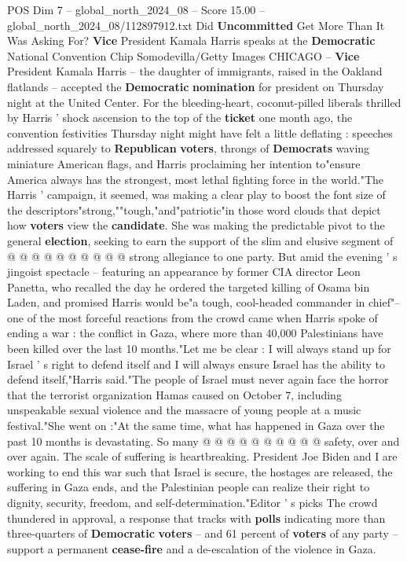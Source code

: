 \begin{textsample}{POS Dim 7 – global\_north\_2024\_08 – Score 15.00 – global\_north\_2024\_08/112897912.txt}  \label{ex:f7_pos_004}
Did \textbf{Uncommitted} Get More Than It Was Asking For? \textbf{Vice} President Kamala Harris speaks at the \textbf{Democratic} National Convention Chip Somodevilla/Getty Images CHICAGO -- \textbf{Vice} President Kamala Harris -- the daughter of immigrants, raised in the Oakland flatlands -- accepted the \textbf{Democratic} \textbf{nomination} for president on Thursday night at the United Center.
For the bleeding-heart, coconut-pilled liberals thrilled by Harris ' shock ascension to the top of the \textbf{ticket} one month ago, the convention festivities Thursday night might have felt a little deflating : speeches addressed squarely to \textbf{Republican} \textbf{voters}, throngs of \textbf{Democrats} waving miniature American flags, and Harris proclaiming her intention to"ensure America always has the strongest, most lethal fighting force in the world."The Harris ' campaign, it seemed, was making a clear play to boost the font size of the descriptors"strong,""tough,"and"patriotic"in those word clouds that depict how \textbf{voters} view the \textbf{candidate}.
She was making the predictable pivot to the general \textbf{election}, seeking to earn the support of the slim and elusive segment of @ @ @ @ @ @ @ @ @ @ strong allegiance to one party.
But amid the evening ' s jingoist spectacle -- featuring an appearance by former CIA director Leon Panetta, who recalled the day he ordered the targeted killing of Osama bin Laden, and promised Harris would be"a tough, cool-headed commander in chief"-- one of the most forceful reactions from the crowd came when Harris spoke of ending a war : the conflict in Gaza, where more than 40,000 Palestinians have been killed over the last 10 months."Let me be clear : I will always stand up for Israel ' s right to defend itself and I will always ensure Israel has the ability to defend itself,"Harris said."The people of Israel must never again face the horror that the terrorist organization Hamas caused on October 7, including unspeakable sexual violence and the massacre of young people at a music festival."She went on :"At the same time, what has happened in Gaza over the past 10 months is devastating.
So many @ @ @ @ @ @ @ @ @ @ safety, over and over again.
The scale of suffering is heartbreaking.
President Joe Biden and I are working to end this war such that Israel is secure, the hostages are released, the suffering in Gaza ends, and the Palestinian people can realize their right to dignity, security, freedom, and self-determination."Editor ' s picks The crowd thundered in approval, a response that tracks with \textbf{polls} indicating more than three-quarters of \textbf{Democratic} \textbf{voters} -- and 61 percent of \textbf{voters} of any party -- support a permanent \textbf{cease-fire} and a de-escalation of the violence in Gaza.

\end{textsample}
